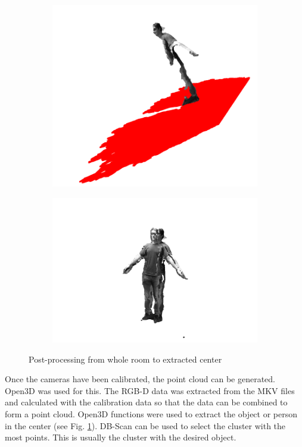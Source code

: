\documentclass[conference]{IEEEtran}
\begin{document}
\begin{figure}[h]
\begin{subfigure}{.24\textwidth}
    \includegraphics[width=\linewidth]{Pictures/PlaneSegmentation.png}
    \end{subfigure}
    \begin{subfigure}{.24\textwidth}
    \includegraphics[width=\linewidth]{Pictures/ExtractetObjectInCenter.png}
    \end{subfigure}
    \caption{Post-processing from whole room to extracted center}
    \label{fig:Post-processing}
\end{figure}
Once the cameras have been calibrated, the point cloud can be generated. Open3D was used for this. The RGB-D data was extracted from the MKV files and calculated with the calibration data so that the data can be combined to form a point cloud. Open3D functions were used to extract the object or person in the center (see Fig. \ref{fig:Post-processing}). DB-Scan can be used to select the cluster with the most points. This is usually the cluster with the desired object.
\end{document}
